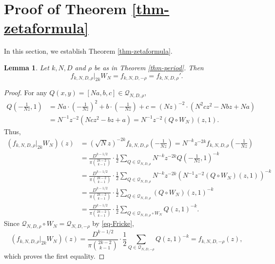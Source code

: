 \documentclass[12pt]{amsart}
\numberwithin{equation}{section}
\newtheorem{lemma}[theorem]{Lemma}
\theoremstyle{definition}
\begin{document}
\section{Proof of Theorem \ref{thm-zetaformula}}\label{sec-zetaformula}

In this section, we establish Theorem \ref{thm-zetaformula}.

\begin{lemma}\label{lem-frickeinv}
    Let $k,N,D$ and $\rho$ be as in Theorem \ref{thm-period}. Then
    $$f_{k,N,D,\rho}|_{2k}W_{N}=f_{k,N,D,-\rho}=f_{k,N,D,\rho}'.$$
\end{lemma}

\begin{proof}
    For any $Q(x,y)=[Na,b,c]\in\mathcal{Q}_{N,D,\rho}$,
    \begin{align*}
        Q\left(-\frac{1}{Nz},1\right)&=Na\cdot\left(-\frac{1}{Nz}\right)^{2}+b\cdot\left(-\frac{1}{Nz}\right)+c=(Nz)^{-2}\cdot(N^{2}cz^{2}-Nbz+Na)\\
        &=N^{-1}z^{-2}(Ncz^{2}-bz+a)=N^{-1}z^{-2}(Q\circ W_{N})(z,1).
    \end{align*}
    Thus,
    \begin{align*}
        (f_{k,N,D,\rho}|_{2k}W_{N})(z)&=(\sqrt{N}z)^{-2k}f_{k,N,D,\rho}\left(-\frac{1}{Nz}\right)=N^{-k}z^{-2k}f_{k,N,D,\rho}\left(-\frac{1}{Nz}\right)\\
        &=\frac{D^{k-1/2}}{\pi\binom{2k-2}{k-1}}\cdot\frac{1}{2}\sum_{Q\in\mathcal{Q}_{N,D,\rho}}N^{-k}z^{-2k}Q\left(-\frac{1}{Nz},1\right)^{-k}\\
        &=\frac{D^{k-1/2}}{\pi\binom{2k-2}{k-1}}\cdot\frac{1}{2}\sum_{Q\in\mathcal{Q}_{N,D,\rho}}N^{-k}z^{-2k}(N^{-1}z^{-2}(Q\circ W_{N})(z,1))^{-k}\\
        &=\frac{D^{k-1/2}}{\pi\binom{2k-2}{k-1}}\cdot\frac{1}{2}\sum_{Q\in\mathcal{Q}_{N,D,\rho}}(Q\circ W_{N})(z,1)^{-k}\\
        &=\frac{D^{k-1/2}}{\pi\binom{2k-2}{k-1}}\cdot\frac{1}{2}\sum_{Q\in\mathcal{Q}_{N,D,\rho}\circ W_{N}}Q(z,1)^{-k}.
    \end{align*}
    Since $\mathcal{Q}_{N,D,\rho}\circ W_{N}=\mathcal{Q}_{N,D,-\rho}$ by \eqref{eq-Fricke},
    $$(f_{k,N,D,\rho}|_{2k}W_{N})(z)=\frac{D^{k-1/2}}{\pi\binom{2k-2}{k-1}}\cdot\frac{1}{2}\sum_{Q\in\mathcal{Q}_{N,D,-\rho}}Q(z,1)^{-k}=f_{k,N,D,-\rho}(z),$$
    which proves the first equality.


\end{proof}
\end{document}
